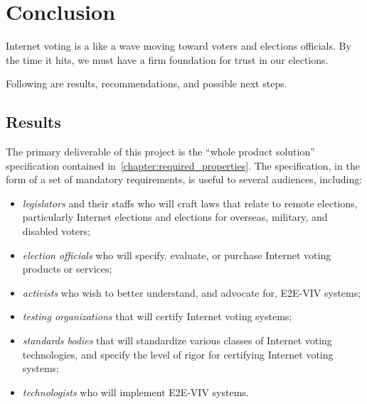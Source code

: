 \chapter{Conclusion}
\label{chapter:conclusion}

Internet voting is a like a wave moving toward voters and elections
officials. By the time it hits, we must have a firm foundation for
trust in our elections.

Following are results, recommendations, and possible next steps.

\section{Results}

The primary deliverable of this project is the ``whole product
solution'' specification contained
in~\autoref{chapter:required_properties}. The specification, in the
form of a set of mandatory requirements, is useful to several
audiences, including:
\begin{itemize}
\item \emph{legislators} and their staffs who will craft laws that
  relate to remote elections, particularly Internet elections and
  elections for overseas, military, and disabled voters;
\item \emph{election officials} who will specify, evaluate, or
  purchase Internet voting products or services;
\item \emph{activists} who wish to better understand, and advocate
  for, E2E-VIV systems;
\item \emph{testing organizations} that will certify Internet voting
  systems;
\item \emph{standards bodies} that will standardize various classes of
  Internet voting technologies, and specify the level of rigor for
  certifying Internet voting systems;
\item \emph{technologists} who will implement E2E-VIV systems.
\end{itemize}

